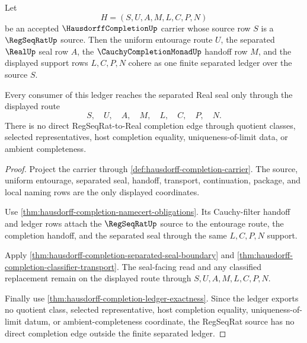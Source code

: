 \begin{theorem}
\label{thm:hausdorff-completion-uniform-regseqrat-seal-coherence}
Let
$$
H=(S,U,A,M,L,C,P,N)
$$
be an accepted $\HausdorffCompletionUp$ carrier whose source row $S$ is a
$\RegSeqRatUp$ source. Then the uniform entourage route $U$, the separated
$\RealUp$ seal row $A$, the $\CauchyCompletionMonadUp$ handoff row $M$, and
the displayed support rows $L,C,P,N$ cohere as one finite separated ledger
over the source $S$.

Every consumer of this ledger reaches the separated Real seal only through
the displayed route
$$
S,\quad U,\quad A,\quad M,\quad L,\quad C,\quad P,\quad N.
$$
There is no direct RegSeqRat-to-Real completion edge through quotient
classes, selected representatives, host completion equality,
uniqueness-of-limit data, or ambient completeness.
\end{theorem}
\begin{proof}
Project the carrier through \autoref{def:hausdorff-completion-carrier}. The
source, uniform entourage, separated seal, handoff, transport, continuation,
package, and local naming rows are the only displayed coordinates.

Use \autoref{thm:hausdorff-completion-namecert-obligations}. Its Cauchy-filter
handoff and ledger rows attach the $\RegSeqRatUp$ source to the entourage
route, the completion handoff, and the separated seal through the same
$L,C,P,N$ support.

Apply \autoref{thm:hausdorff-completion-separated-seal-boundary} and
\autoref{thm:hausdorff-completion-classifier-transport}. The seal-facing read
and any classified replacement remain on the displayed route through
$S,U,A,M,L,C,P,N$.

Finally use \autoref{thm:hausdorff-completion-ledger-exactness}. Since the
ledger exports no quotient class, selected representative, host completion
equality, uniqueness-of-limit datum, or ambient-completeness coordinate, the
RegSeqRat source has no direct completion edge outside the finite separated
ledger.
\end{proof}

